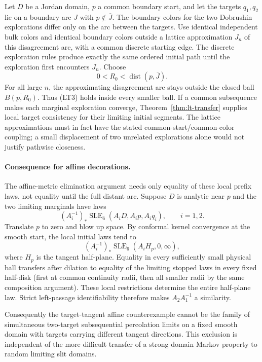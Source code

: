 \documentclass[11pt]{article}
\theoremstyle{definition}\newtheorem{definition}[theorem]{Definition}
\theoremstyle{remark}\newtheorem{remark}[theorem]{Remark}
\begin{document}
Let $D$ be a Jordan domain, $p$ a common boundary start, and let the targets
$q_1,q_2$ lie on a boundary arc $J$ with $p\notin\overline J$.
The boundary colors for the two Dobrushin explorations differ only on the
arc between the targets. Use identical independent bulk colors and identical
boundary colors outside a lattice approximation $J_n$ of this disagreement
arc, with a common discrete starting edge. The discrete exploration rules
produce exactly the same ordered initial path until the exploration first
encounters $J_n$.
Choose
\[
 0<R_0<\operatorname{dist}(p,\overline J).
\]
For all large $n$, the approximating disagreement arc stays outside the
closed ball $\overline{B(p,R_0)}$. Thus (LT3) holds inside every smaller
ball. If a common subsequence makes each marginal exploration converge,
Theorem~\ref{thm:lt-transfer} supplies local target consistency for their
limiting initial segments. The lattice approximations must in fact have the
stated common-start/common-color coupling; a small displacement of two
unrelated explorations alone would not justify pathwise closeness.

\paragraph{Consequence for affine decorations.}
The affine-metric elimination argument needs only equality of these local
prefix laws, not equality until the full distant arc. Suppose $D$ is
analytic near $p$ and the two limiting marginals have laws
\[
 (A_i^{-1})_*\operatorname{SLE}_6(A_iD,A_ip,A_iq_i),\qquad i=1,2.
\]
Translate $p$ to zero and blow up space. By conformal kernel convergence at
the smooth start, the local initial laws tend to
\[
 (A_i^{-1})_*\operatorname{SLE}_6(A_iH_p,0,\infty),
\]
where $H_p$ is the tangent half-plane. Equality in every sufficiently small
physical ball transfers after dilation to equality of the limiting stopped
laws in every fixed half-disk (first at common continuity radii, then all
smaller radii by the same composition argument). These local restrictions
determine the entire half-plane law. Strict left-passage identifiability
therefore makes $A_2A_1^{-1}$ a similarity.

Consequently the target-tangent affine counterexample cannot be the family
of simultaneous two-target subsequential percolation limits on a fixed
smooth domain with targets carrying different tangent directions. This
exclusion is independent of the more difficult transfer of a strong domain
Markov property to random limiting slit domains.
\end{document}
